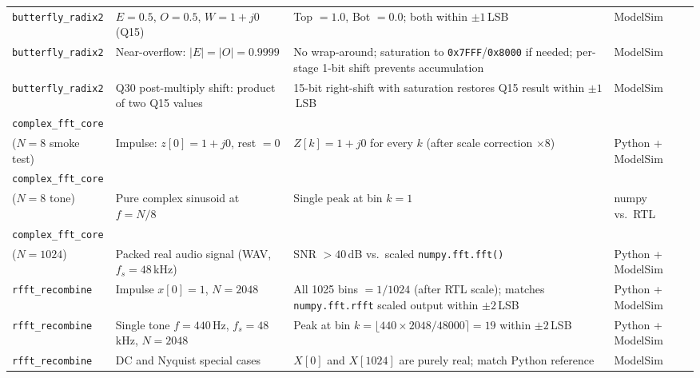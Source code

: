 \documentclass[12pt, a4paper]{article}
\begin{document}
\begin{longtable}{p{2.8cm} p{4.2cm} p{4.8cm} p{2.6cm}}
    \texttt{butterfly\_radix2}
        & $E{=}0.5$, $O{=}0.5$, $W{=}1{+}j0$ (Q15)
        & Top $= 1.0$, Bot $= 0.0$; both within $\pm 1$\,LSB
        & ModelSim \\[3pt]

    \texttt{butterfly\_radix2}
        & Near-overflow: $|E|{=}|O|{=}0.9999$
        & No wrap-around; saturation to \texttt{0x7FFF}/\texttt{0x8000} if needed;
          per-stage 1-bit shift prevents accumulation
        & ModelSim \\[3pt]

    \texttt{butterfly\_radix2}
        & Q30 post-multiply shift: product of two Q15 values
        & 15-bit right-shift with saturation restores Q15 result
          within $\pm 1$\,LSB
        & ModelSim \\[3pt]

    \texttt{complex\_fft\_core}\\($N{=}8$ smoke test)
        & Impulse: $z[0]{=}1{+}j0$, rest $= 0$
        & $Z[k]{=}1{+}j0$ for every $k$ (after scale correction $\times8$)
        & Python + ModelSim \\[3pt]

    \texttt{complex\_fft\_core}\\($N{=}8$ tone)
        & Pure complex sinusoid at $f{=}N/8$
        & Single peak at bin $k{=}1$
        & numpy vs.\ RTL \\[3pt]

    \texttt{complex\_fft\_core}\\($N{=}1024$)
        & Packed real audio signal (WAV, $f_s{=}48$\,kHz)
        & SNR $> 40$\,dB vs.\ scaled \texttt{numpy.fft.fft()}
        & Python + ModelSim \\[3pt]

    \texttt{rfft\_recombine}
        & Impulse $x[0]{=}1$, $N{=}2048$
        & All 1025 bins $= 1/1024$ (after RTL scale); matches
          \texttt{numpy.fft.rfft} scaled output within $\pm 2$\,LSB
        & Python + ModelSim \\[3pt]

    \texttt{rfft\_recombine}
        & Single tone $f{=}440$\,Hz, $f_s{=}48$\,kHz, $N{=}2048$
        & Peak at bin $k = \lfloor 440 \times 2048 / 48000 \rceil = 19$
          within $\pm 2$\,LSB
        & Python + ModelSim \\[3pt]

    \texttt{rfft\_recombine}
        & DC and Nyquist special cases
        & $X[0]$ and $X[1024]$ are purely real; match Python reference
        & ModelSim \\[3pt]


\end{longtable}
\end{document}
